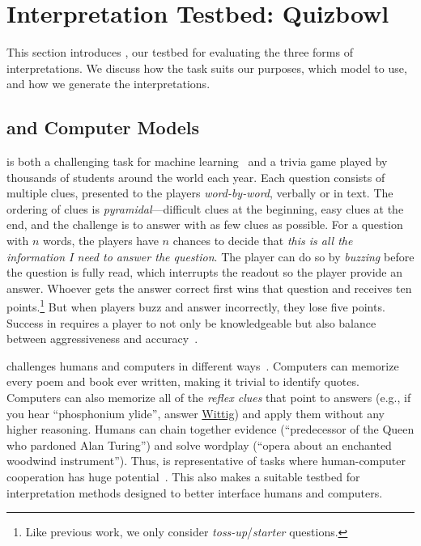 \section{Interpretation Testbed: Quizbowl}
\label{sec:eval_qb}

This section introduces \qb{}, our testbed for evaluating the three
forms of interpretations. We discuss how the task suits our purposes,
which model to use, and how we generate the interpretations.

\subsection{\qb{} and Computer Models}

\qb{} is both a challenging task for
machine learning~\cite{boydgraber2012besting} and a trivia game played
by thousands of students around the world each year. Each question
consists of multiple clues, presented to the players
\emph{word-by-word}, verbally or in text.
The ordering of \qb{} clues is
\emph{pyramidal}---difficult clues at the beginning, easy clues at the
end, and the challenge is to answer with as few clues as possible.
For a question with $n$ words, the players have $n$ chances to decide
that \emph{this is all the information I need to answer the question}.
The player can do so by \emph{buzzing} before the question is fully
read, which interrupts the readout so
the player provide an answer. Whoever gets the answer correct first
wins that question and receives ten points.\footnote{Like previous
work, we only consider \emph{toss-up}/\emph{starter} questions.} But
when players buzz and answer incorrectly, they lose five points.
Success in \qb{} requires a player to not only be knowledgeable but
also balance between aggressiveness and
accuracy~\cite{he2016opponent}.

\qb{} challenges humans and computers in different
ways~\cite{boydgraber2012besting, wallace2018trick}.  Computers can
memorize every poem and book ever written, making it trivial to
identify quotes.  Computers can also memorize all of the \emph{reflex
clues} that point to answers (e.g., if you hear ``phosphonium ylide'',
answer \underline{Wittig}) and apply them without any higher reasoning.
Humans can chain together evidence (``predecessor of the Queen who
pardoned Alan Turing'') and solve wordplay (``opera about an enchanted
woodwind instrument'').  
Thus, \qb{} is representative of tasks where human-computer
cooperation 
has huge potential~\cite{Thompson-13}. This also makes \qb{} a
suitable testbed for interpretation methods designed to better
interface humans and computers.

